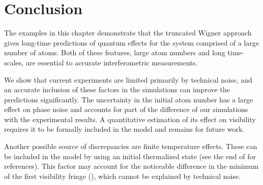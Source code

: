 \section{Conclusion}

The examples in this chapter demonstrate that the truncated Wigner approach gives long-time predictions of quantum effects for the system comprised of a large number of atoms.
Both of these features, large atom numbers and long time-scales, are essential to accurate interferometric measurements.

We show that current experiments are limited primarily by technical noise, and an accurate inclusion of these factors in the simulations can improve the predictions significantly.
The uncertainty in the initial atom number has a large effect on phase noise and accounts for part of the difference of our simulations with the experimental results.
A quantitative estimation of its effect on visibility requires it to be formally included in the
model and remains for future work.

Another possible source of discrepancies are finite temperature effects.
These can be included in the model by using an initial thermalized state (see the end of  for references).
This factor may account for the noticeable difference in the minimum of the first visibility fringe (), which cannot be explained by technical noise.
